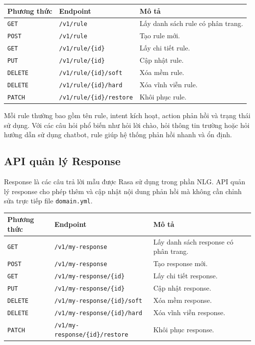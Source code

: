 \begin{longtable}{|p{3cm}|p{5cm}|p{7cm}|}
\hline
\textbf{Phương thức} & \textbf{Endpoint} & \textbf{Mô tả} \\
\hline
\texttt{GET} & \texttt{/v1/rule} & Lấy danh sách rule có phân trang. \\
\hline
\texttt{POST} & \texttt{/v1/rule} & Tạo rule mới. \\
\hline
\texttt{GET} & \texttt{/v1/rule/\{id\}} & Lấy chi tiết rule. \\
\hline
\texttt{PUT} & \texttt{/v1/rule/\{id\}} & Cập nhật rule. \\
\hline
\texttt{DELETE} & \texttt{/v1/rule/\{id\}/soft} & Xóa mềm rule. \\
\hline
\texttt{DELETE} & \texttt{/v1/rule/\{id\}/hard} & Xóa vĩnh viễn rule. \\
\hline
\texttt{PATCH} & \texttt{/v1/rule/\{id\}/restore} & Khôi phục rule. \\
\hline
\end{longtable}

Mỗi rule thường bao gồm tên rule, intent kích hoạt, action phản hồi và trạng thái sử dụng. Với các câu hỏi phổ biến như hỏi lời chào, hỏi thông tin trường hoặc hỏi hướng dẫn sử dụng chatbot, rule giúp hệ thống phản hồi nhanh và ổn định.

\subsection{API quản lý Response}

Response là các câu trả lời mẫu được Rasa sử dụng trong phần NLG. API quản lý response cho phép thêm và cập nhật nội dung phản hồi mà không cần chỉnh sửa trực tiếp file \texttt{domain.yml}.

\begin{longtable}{|p{3cm}|p{5cm}|p{7cm}|}
\hline
\textbf{Phương thức} & \textbf{Endpoint} & \textbf{Mô tả} \\
\hline
\texttt{GET} & \texttt{/v1/my-response} & Lấy danh sách response có phân trang. \\
\hline
\texttt{POST} & \texttt{/v1/my-response} & Tạo response mới. \\
\hline
\texttt{GET} & \texttt{/v1/my-response/\{id\}} & Lấy chi tiết response. \\
\hline
\texttt{PUT} & \texttt{/v1/my-response/\{id\}} & Cập nhật response. \\
\hline
\texttt{DELETE} & \texttt{/v1/my-response/\{id\}/soft} & Xóa mềm response. \\
\hline
\texttt{DELETE} & \texttt{/v1/my-response/\{id\}/hard} & Xóa vĩnh viễn response. \\
\hline
\texttt{PATCH} & \texttt{/v1/my-response/\{id\}/restore} & Khôi phục response. \\
\hline
\end{longtable}

